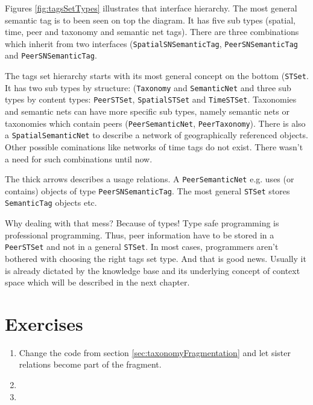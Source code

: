 Figures \ref{fig:tagsSetTypes} illustrates that interface hierarchy. The most general semantic tag is to been seen on top the diagram. It has five sub types (spatial, time, peer and taxonomy and semantic net tags). There are three combinations which inherit from two interfaces
({\tt SpatialSNSemanticTag}, {\tt PeerSNSemanticTag} and
{\tt PeerSNSemanticTag}.

The tags set hierarchy starts with its most general concept on the bottom ({\tt STSet}. It has two sub types by structure: ({\tt Taxonomy} and {\tt SemanticNet} and three sub types by content types: {\tt PeerSTSet}, {\tt SpatialSTSet} and {\tt TimeSTSet}. Taxonomies and semantic nets can have more specific sub types, namely semantic nets or taxonomies which contain peers ({\tt PeerSemanticNet}, {\tt PeerTaxonomy}). There is also a {\tt SpatialSemanticNet} to describe a network of geographically referenced objects. Other possible cominations like networks of time tags do not exist. There wasn't a need for such combinations until now.

The thick arrows describes a usage relations. A {\tt PeerSemanticNet} e.g. uses (or contains) objects of type {\tt PeerSNSemanticTag}. The most general {\tt STSet} stores {\tt SemanticTag} objects etc.

Why dealing with that mess? Because of types! Type safe programming is professional programming. Thus, peer information have to be stored in a {\tt PeerSTSet} and not in a general {\tt STSet}. In most cases, programmers aren't bothered with choosing the right tags set type. And that is good news. Usually it is already dictated by the knowledge base and its underlying concept of context space which will be described in the next chapter.

\section{Exercises}
\begin{enumerate}
\item
Change the code from section \ref{sec:taxonomyFragmentation} and let sister relations become part of the fragment.
\item
\item

\end{enumerate}
